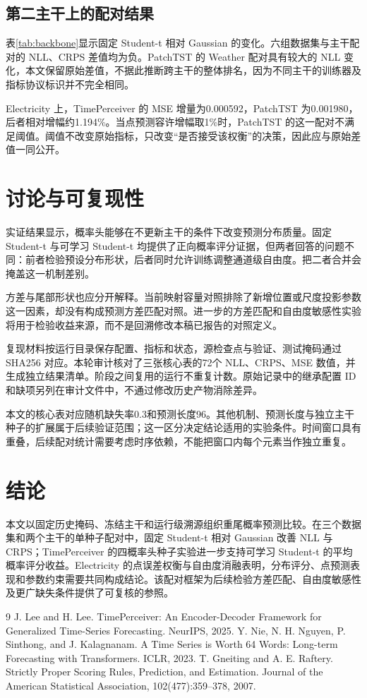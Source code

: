 \documentclass[11pt,a4paper,twocolumn]{article}
\begin{document}
\subsection{第二主干上的配对结果}

表\ref{tab:backbone}显示固定 Student-t 相对 Gaussian 的变化。六组数据集与主干配对的 NLL、CRPS 差值均为负。PatchTST 的 Weather 配对具有较大的 NLL 变化，本文保留原始差值，不据此推断跨主干的整体排名，因为不同主干的训练器及指标协议标识并不完全相同。

Electricity 上，TimePerceiver 的 MSE 增量为0.000592，PatchTST 为0.001980，后者相对增幅约1.194\%。当点预测容许增幅取1\%时，PatchTST 的这一配对不满足阈值。阈值不改变原始指标，只改变“是否接受该权衡”的决策，因此应与原始差值一同公开。

\section{讨论与可复现性}
实证结果显示，概率头能够在不更新主干的条件下改变预测分布质量。固定 Student-t 与可学习 Student-t 均提供了正向概率评分证据，但两者回答的问题不同：前者检验预设分布形状，后者同时允许训练调整通道级自由度。把二者合并会掩盖这一机制差别。

方差与尾部形状也应分开解释。当前映射容量对照排除了新增位置或尺度投影参数这一因素，却没有构成预测方差匹配对照。进一步的方差匹配和自由度敏感性实验将用于检验收益来源，而不是回溯修改本稿已报告的对照定义。

复现材料按运行目录保存配置、指标和状态，源检查点与验证、测试掩码通过 SHA256 对应。本轮审计核对了三张核心表的72个 NLL、CRPS、MSE 数值，并生成独立结果清单。阶段之间复用的运行不重复计数。原始记录中的继承配置 ID 和缺项另列在审计文件中，不通过修改历史产物消除差异。

本文的核心表对应随机缺失率0.3和预测长度96。其他机制、预测长度与独立主干种子的扩展属于后续验证范围；这一区分决定结论适用的实验条件。时间窗口具有重叠，后续配对统计需要考虑时序依赖，不能把窗口内每个元素当作独立重复。

\section{结论}
本文以固定历史掩码、冻结主干和运行级溯源组织重尾概率预测比较。在三个数据集和两个主干的单种子配对中，固定 Student-t 相对 Gaussian 改善 NLL 与 CRPS；TimePerceiver 的四概率头种子实验进一步支持可学习 Student-t 的平均概率评分收益。Electricity 的点误差权衡与自由度消融表明，分布评分、点预测表现和参数约束需要共同构成结论。该配对框架为后续检验方差匹配、自由度敏感性及更广缺失条件提供了可复核的参照。

\begin{thebibliography}{9}
 J. Lee and H. Lee. TimePerceiver: An Encoder-Decoder Framework for Generalized Time-Series Forecasting. NeurIPS, 2025.
 Y. Nie, N. H. Nguyen, P. Sinthong, and J. Kalagnanam. A Time Series is Worth 64 Words: Long-term Forecasting with Transformers. ICLR, 2023.
 T. Gneiting and A. E. Raftery. Strictly Proper Scoring Rules, Prediction, and Estimation. Journal of the American Statistical Association, 102(477):359--378, 2007.
\end{thebibliography}
\end{document}
